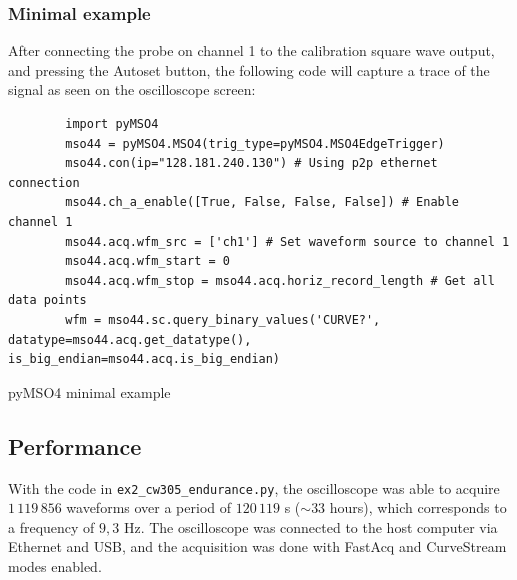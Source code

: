 \documentclass[a4paper,english,twoside,10pt]{article}
\begin{document}
\subsubsection{Minimal example}
After connecting the probe on channel 1 to the calibration square wave output, and pressing the Autoset button, the following code will capture a trace of the signal as seen on the oscilloscope screen:
\begin{flushleft}
	\captionsetup{type=listing}
	\begin{verbatim}
		import pyMSO4
		mso44 = pyMSO4.MSO4(trig_type=pyMSO4.MSO4EdgeTrigger)
		mso44.con(ip="128.181.240.130") # Using p2p ethernet connection
		mso44.ch_a_enable([True, False, False, False]) # Enable channel 1
		mso44.acq.wfm_src = ['ch1'] # Set waveform source to channel 1
		mso44.acq.wfm_start = 0
		mso44.acq.wfm_stop = mso44.acq.horiz_record_length # Get all data points
		wfm = mso44.sc.query_binary_values('CURVE?', datatype=mso44.acq.get_datatype(), is_big_endian=mso44.acq.is_big_endian)
	\end{verbatim}
	\caption{pyMSO4 minimal example}
\end{flushleft}

\subsection{Performance}
With the code in \texttt{ex2\_cw305\_endurance.py}, the oscilloscope was able to acquire \(1\,119\,856\) waveforms over a period of \(120\,119\) s (\(\sim33\) hours), which corresponds to a frequency of \(9,3\) Hz. The oscilloscope was connected to the host computer via Ethernet and USB, and the acquisition was done with FastAcq and CurveStream modes enabled.
\end{document}
